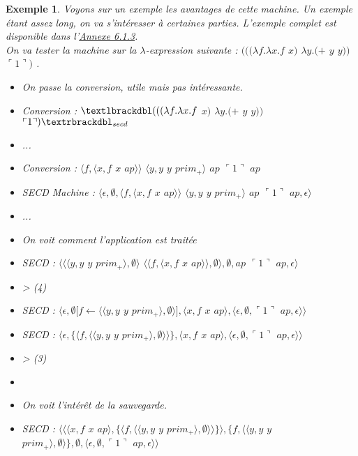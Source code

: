 \documentclass[10pt,a4paper]{report}
\newtheorem{ex}{Exemple}
\begin{document}
\begin{ex}
	Voyons sur un exemple les avantages de cette machine. Un exemple étant assez long, on va s'intéresser à certaines parties. L'exemple complet est disponible dans l'\hyperref[SECD]{Annexe 6.1.3}. 
	\\
	On va tester la machine sur la $\lambda$-expression suivante : $(((\lambda f.\lambda x.f$ $x)$ $\lambda y.(+$ $y$ $y))$ $\ulcorner 1\urcorner)$ .
	\bigbreak
	
	\begin{itemize}
		\item[] On passe la conversion, utile mais pas intéressante.
		\item[] Conversion : $\textlbrackdbl(((\lambda f.\lambda x.f$ $x)$ $\lambda y.(+$ $y$ $y))$ $\ulcorner 1\urcorner)\textrbrackdbl_{secd}$
		\item[] ...
		\item[] Conversion : $\langle f,\langle x,f$ $x$ $ap\rangle\rangle$ $\langle y,y$ $y$ $prim_{+}\rangle$ $ap$ $\ulcorner 1\urcorner$ $ap$
		\item[] SECD Machine : $\langle\epsilon,\emptyset,\langle f,\langle x,f$ $x$ $ap\rangle\rangle$ $\langle y,y$ $y$ $prim_{+}\rangle$ $ap$ $\ulcorner 1\urcorner$ $ap,\epsilon\rangle$ 
		\item[] ...
		\item[] On voit comment l'application est traitée
		\item[] SECD : $\langle\langle\langle y,y$ $y$ $prim_{+}\rangle,\emptyset\rangle$ $\langle\langle f,\langle x,f$ $x$ $ap\rangle\rangle,\emptyset\rangle,\emptyset,ap$ $\ulcorner 1\urcorner$ $ap,\epsilon\rangle$
		\item[] > (4)
		\item[] SECD : $\langle\epsilon,\emptyset[f \leftarrow \langle\langle y,y$ $y$ $prim_{+}\rangle,\emptyset\rangle],\langle x,f$ $x$ $ap\rangle,\langle\epsilon,\emptyset,\ulcorner 1\urcorner$ $ap,\epsilon\rangle\rangle$
		\item[] SECD : $\langle\epsilon,\{\langle f,\langle\langle y,y$ $y$ $prim_{+}\rangle,\emptyset\rangle\rangle\},\langle x,f$ $x$ $ap\rangle,\langle\epsilon,\emptyset,\ulcorner 1\urcorner$ $ap,\epsilon\rangle\rangle$
		\item[] >  (3)
		\item[] 
		\item[] On voit l'intérêt de la sauvegarde.
		\item[] SECD : $\langle\langle\langle x,f$ $x$ $ap\rangle,\{\langle f,\langle\langle y,y$ $y$ $prim_{+}\rangle,\emptyset\rangle\rangle\}\rangle,\{f,\langle\langle y,y$ $y$ $prim_{+}\rangle,\emptyset\rangle\},\emptyset,\langle\epsilon,\emptyset,\ulcorner 1\urcorner$ $ap,\epsilon\rangle\rangle$

\end{itemize}
\end{ex}
\end{document}
